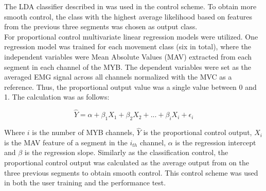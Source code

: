 The LDA classifier described in  was used in the control scheme. To obtain more smooth control, the class with the highest average likelihood based on features from the previous three segments was chosen as output class. \\
For proportional control multivariate linear regression models were utilized. One regression model was trained for each movement class (six in total), where the independent variables were Mean Absolute Values (MAV) extracted from each segment in each channel of the MYB. The dependent variables were set as the averaged EMG signal across all channels normalized with the MVC as a reference. Thus, the proportional output value was a single value between 0 and 1. The calculation was as follows: 

\begin{equation} \label{eq:P:multiLinearRegression}
\hat{Y} = \alpha + \beta_1 X_{1} + \beta_2 X_{2} + ... + \beta_i X_{i} + \epsilon_i
\end{equation} 

Where $i$ is the number of MYB channels, $\hat{Y}$ is the proportional control output, $X_{i}$ is the MAV feature of a segment in the $i_{th}$ channel, $\alpha$ is the regression intercept and $\beta$ is the regression slope. Similarly as the classification control, the proportional control output was calculated as the average output from on the three previous segments to obtain smooth control. This control scheme was used in both the user training and the performance test.